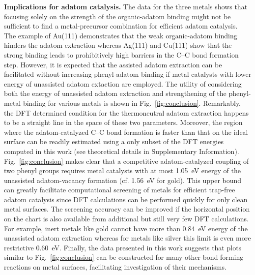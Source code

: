 \documentclass[journal=jacsat,manuscript=article]{achemso}
\newcommand{\sinfo}{Supplementary Information}
\begin{document}
\textbf{Implications for adatom catalysis.} 
%
The data for the three metals shows that focusing solely on the strength of the organic-adatom binding might not be sufficient to find a metal-precursor combination for efficient adatom catalysis. The example of Au(111) demonstrates that the weak organic-adatom binding hinders the adatom extraction whereas Ag(111) and Cu(111) show that the strong binding leads to prohibitively high barriers in the C--C bond formation step. However, it is expected that the assisted adatom extraction can be facilitated without increasing phenyl-adatom binding if metal catalysts with lower energy of unassisted adatom extaction are employed. The utility of considering both the energy of unassisted adatom extraction and strengthening of the phenyl-metal binding for various metals is shown in Fig.~\ref{fig:conclusion}. Remarkably, the DFT determined condition for the thermoneutral adatom extraction happens to be a straight line in the space of these two parameters. Moreover, the region where the adatom-catalyzed C--C bond formation is faster than that on the ideal surface can be readily estimated using a only subset of the DFT energies computed in this work (see theoretical details in \sinfo). Fig.~\ref{fig:conclusion} makes clear that a competitive adatom-catalyzed coupling of two phenyl groups requires metal catalysts with at most \SI{1.05}{\electronvolt} energy of the unassisted adatom-vacancy formation (cf. \SI{1.56}{\electronvolt} for gold). This upper bound can greatly facilitate computational screening of metals for efficient trap-free adatom catalysis since DFT calculations can be performed quickly for only clean metal surfaces. The screening accuracy can be improved if the horizontal position on the chart is also available from additional but still very few DFT calculations. For example, inert metals like gold cannot have more than \SI{0.84}{\electronvolt} energy of the unassisted adatom extraction whereas for metals like silver this limit is even more restrictive \SI{0.60}{\electronvolt}. Finally, the data presented in this work suggests that plots similar to Fig.~\ref{fig:conclusion} can be constructed for many other bond forming reactions on metal surfaces, facilitating investigation of their mechanisms. 
\end{document}
